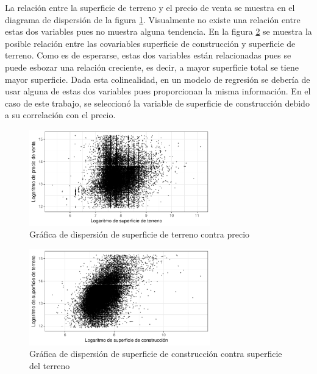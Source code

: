 La relación entre la superficie de terreno y el precio de venta se muestra en el diagrama de dispersión de la figura \ref{fig:eda_dispersion_superficie_total_vs_precio}. Visualmente no existe una relación entre estas dos variables pues no muestra alguna tendencia. En la figura \ref{fig:eda_dispersion_superficie_total_vs_superficie} se muestra la posible relación entre las covariables superficie de construcción y superficie de terreno. Como es de esperarse, estas dos variables están relacionadas pues se puede esbozar una relación creciente, es decir, a mayor superficie total se tiene mayor superficie. Dada esta colinealidad, en un modelo de regresión se debería de usar alguna de estas dos variables pues proporcionan la misma información. En el caso de este trabajo, se seleccionó la variable de superficie de construcción debido a su correlación con el precio.


\begin{figure}[H]
    \centering
    \includegraphics[width=0.7\textwidth]{images/eda_dispersion_superficie_total_vs_precio.pdf}
    \caption{Gráfica de dispersión de superficie de terreno contra precio}
    \label{fig:eda_dispersion_superficie_total_vs_precio}
\end{figure}


\begin{figure}[H]
    \centering
    \includegraphics[width=0.7\textwidth]{images/eda_dispersion_superficie_total_vs_superficie.pdf}
    \caption{Gráfica de dispersión de superficie de construcción contra superficie del terreno}
    \label{fig:eda_dispersion_superficie_total_vs_superficie}
\end{figure}


